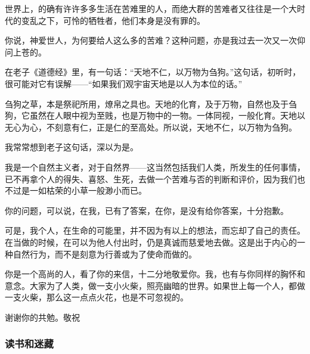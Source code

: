 \par {}
\par 世界上，的确有许许多多生活在苦难里的人，而绝大群的苦难者又往往是一个大时代的变乱之下，可怜的牺牲者，他们本身是没有罪的。
\par 你说，神爱世人，为何要给人这么多的苦难？这种问题，亦是我过去一次又一次仰问上苍的。
\par 在老子《道德经》里，有一句话：“天地不仁，以万物为刍狗。”这句话，初听时，很可能对它有误解——“如果我们观宇宙天地是以人为本位的话。”
\par 刍狗之草，本是祭祀所用，燎帛之具也。天地的化育，及于万物，自然也及于刍狗，它虽然在人眼中视为至贱，也是万物中的一物。一体同视，一般化育。天地以无心为心，不刻意有仁，正是仁的至高处。所以说，天地不仁，以万物为刍狗。
\par 我常常想到老子这句话，深以为是。
\par 我是一个自然主义者，对于自然界——这当然包括我们人类，所发生的任何事情，已不再拿个人的得失、喜怒、生死，去做一个苦难与否的判断和评价，因为我们也不过是一如枯荣的小草一般渺小而已。
\par 你的问题，可以说，在我，已有了答案，在你，是没有给你答案，十分抱歉。
\par 可是，我个人，在生命的可能里，并不因为有以上的想法，而忘却了自己的责任。在当做的时候，在可以为他人付出时，仍是真诚而慈爱地去做。这是出于内心的一种自然行为，而不是刻意为行善或为了使命而做的。
\par 你是一个高尚的人，看了你的来信，十二分地敬爱你。我，也有与你同样的胸怀和意念。大家为了人类，做一支小火柴，照亮幽暗的世界。如果世上每一个人，都做一支火柴，那么这一点点火花，也是不可忽视的。
\par 谢谢你的共勉。敬祝
\par {}
\par {}


\subsubsection{读书和迷藏}


